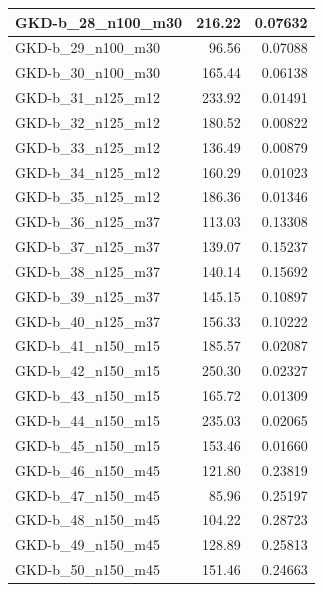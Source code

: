 \documentclass{article}
\begin{document}
\begin{table}[ht]
\begin{tabular}{|l|r|r|}
GKD-b\_28\_n100\_m30 & 216.22 & 0.07632 \\ \hline
GKD-b\_29\_n100\_m30 & 96.56 & 0.07088 \\ \hline
GKD-b\_30\_n100\_m30 & 165.44 & 0.06138 \\ \hline
GKD-b\_31\_n125\_m12 & 233.92 & 0.01491 \\ \hline
GKD-b\_32\_n125\_m12 & 180.52 & 0.00822 \\ \hline
GKD-b\_33\_n125\_m12 & 136.49 & 0.00879 \\ \hline
GKD-b\_34\_n125\_m12 & 160.29 & 0.01023 \\ \hline
GKD-b\_35\_n125\_m12 & 186.36 & 0.01346 \\ \hline
GKD-b\_36\_n125\_m37 & 113.03 & 0.13308 \\ \hline
GKD-b\_37\_n125\_m37 & 139.07 & 0.15237 \\ \hline
GKD-b\_38\_n125\_m37 & 140.14 & 0.15692 \\ \hline
GKD-b\_39\_n125\_m37 & 145.15 & 0.10897 \\ \hline
GKD-b\_40\_n125\_m37 & 156.33 & 0.10222 \\ \hline
GKD-b\_41\_n150\_m15 & 185.57 & 0.02087 \\ \hline
GKD-b\_42\_n150\_m15 & 250.30 & 0.02327 \\ \hline
GKD-b\_43\_n150\_m15 & 165.72 & 0.01309 \\ \hline
GKD-b\_44\_n150\_m15 & 235.03 & 0.02065 \\ \hline
GKD-b\_45\_n150\_m15 & 153.46 & 0.01660 \\ \hline
GKD-b\_46\_n150\_m45 & 121.80 & 0.23819 \\ \hline
GKD-b\_47\_n150\_m45 & 85.96 & 0.25197 \\ \hline
GKD-b\_48\_n150\_m45 & 104.22 & 0.28723 \\ \hline
GKD-b\_49\_n150\_m45 & 128.89 & 0.25813 \\ \hline
GKD-b\_50\_n150\_m45 & 151.46 & 0.24663 \\ \hline
\end{tabular}
\end{table}
\end{document}
